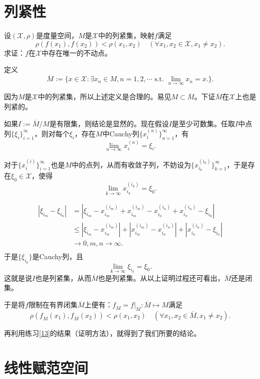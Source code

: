 \section{列紧性}

\begin{exercise}

设$(\mathscr{X},\rho)$是度量空间，$M$是$\mathscr{X}$中的列紧集，映射$f$满足
$$\rho(f(x_1),f(x_2))<\rho(x_1,x_2)\quad(\forall x_1,x_2\in\mathscr{X},x_1\neq x_2).$$
求证：$f$在$\mathscr{X}$中存在唯一的不动点。

定义
$$\overline{M}:=\{x\in\mathscr{X}:\exists x_n\in M,n=1,2,\cdots\text{ s.t. }\lim_{n\rightarrow\infty}x_n=x.\}.$$

因为$M$是$\mathscr{X}$中的列紧集，所以上述定义是合理的。易见$M\subset\overline{M}$。下证$\overline{M}$在$\mathscr{X}$上也是列紧的。

如果$I:=\overline{M}/M$是有限集，则结论是显然的。现在假设$I$是至少可数集。任取$I$中点列$\{\xi_i\}_{i=1}^{\infty}$，则对每个$\xi_i$，存在$M$中Cauchy列$\{x_i^{(n)}\}_{n=1}^{\infty}$，有
$$\lim_{n\rightarrow\infty}x_i^{(n)}=\xi_i.$$


对于$\{x_i^{(i)}\}_{i=1}^{\infty}$也是$M$中的点列，从而有收敛子列，不妨设为$\{x_{i_k}^{(i_k)}\}_{k=1}^{\infty}$，于是存在$\xi_0\in\mathscr{X}$，使得
$$\lim_{k\rightarrow\infty}x_{i_k}^{(i_k)}=\xi_0.$$

\begin{align*}
|\xi_{i_m}-\xi_{i_n}|&=|\xi_{i_m}-x_{i_m}^{(i_m)}+x_{i_m}^{(i_m)}-x_{i_n}^{(i_n)}+x_{i_n}^{(i_n)}-\xi_{i_n}|\\
&\leq|\xi_{i_m}-x_{i_m}^{(i_m)}|+|x_{i_m}^{(i_m)}-x_{i_n}^{(i_n)}|+|x_{i_n}^{(i_n)}-\xi_{i_n}|\\
&\rightarrow0,m,n\rightarrow\infty.\\
\end{align*}
于是$\{\xi_{i_k}\}$是Cauchy列，且
$$\lim_{k\rightarrow\infty}\xi_{i_k}=\xi_0.$$
这就是说$I$也是列紧集，从而$\overline{M}$也是列紧集。从以上证明过程还可看出，$\overline{M}$还是闭集。

于是将$f$限制在有界闭集$\overline{M}$上便有：$f_{\overline{M}}=f|_{\overline{M}}:\overline{M}\mapsto M$满足
$$\rho(f_{\overline{M}}(x_1),f_{\overline{M}}(x_2))<\rho(x_1,x_2)\quad(\forall x_1,x_2\in\overline{M},x_1\neq x_2).$$

再利用练习\ref{13}的结果（证明方法），就得到了我们所要的结论。
\end{exercise}

\section{线性赋范空间}

